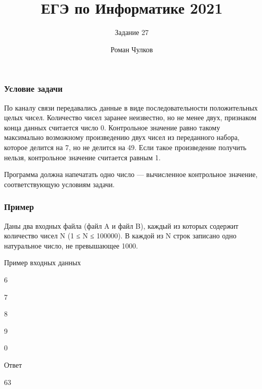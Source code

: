 \documentclass{beamer}
\title[Задание 27]{ЕГЭ по Информатике 2021}
\subtitle{Задание 27}
\author{Роман Чулков}
\institute{СПбГУТ}
\begin{document}
\frame{\titlepage}

\begin{frame}

    \frametitle{Условие задачи}

    По каналу связи передавались данные в виде последовательности положительных целых чисел. Количество чисел заранее неизвестно, но не менее двух, признаком конца данных считается число 0. Контрольное значение равно такому максимально возможному произведению двух чисел из переданного набора, которое делится на 7, но не делится на 49. Если такое произведение получить нельзя, контрольное значение считается равным 1.

    Программа должна напечатать одно число — вычисленное контрольное значение, соответствующую условиям задачи.

\end{frame}

\begin{frame}

    \frametitle{Пример}

    Даны два входных файла (файл A и файл B), каждый из которых содержит количество чисел N (1 ≤ N ≤ 100000). В каждой из N строк записано одно натуральное число, не превышающее 1000.

    \begin{block}{Пример входных данных}

        6

        7

        8

        9

        0
        
    \end{block}

    \pause

    \begin{alertblock}{Ответ}

        63

    \end{alertblock}

\end{frame}
\end{document}
